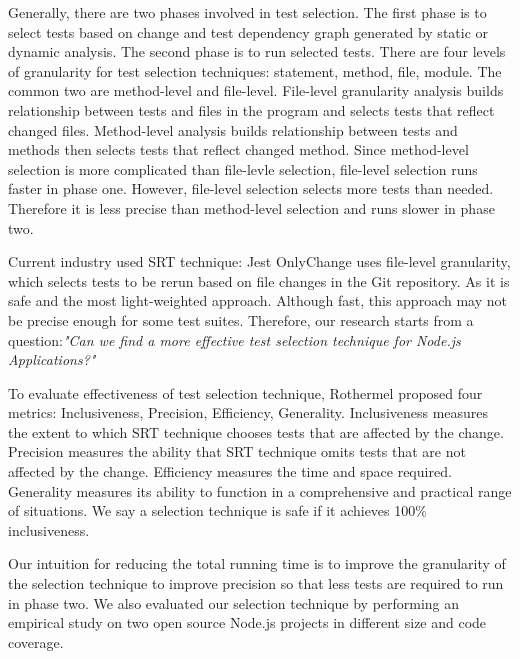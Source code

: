 \documentclass[10pt, conference]{IEEEtran}
\begin{document}
Generally, there are two phases involved in test selection. The first phase is to select tests based on change and 
test dependency graph generated by static or dynamic analysis. The second phase is to run selected tests.
There are four levels of granularity for test selection techniques: statement, method, file, module. The common 
two are method-level and file-level. File-level granularity analysis builds relationship between tests and files in 
the program and selects tests that reflect changed files. Method-level analysis builds relationship between tests and methods 
then selects tests that reflect changed method. Since method-level selection is more complicated than 
file-levle selection, file-level selection runs faster in phase one. However, file-level selection selects more 
tests than needed. Therefore it is less precise than method-level selection and runs slower in phase two. 

Current industry used SRT technique: Jest OnlyChange uses file-level granularity, which selects 
tests to be rerun based on file changes in the Git repository. As it is safe and the most light-weighted approach. Although fast, this approach may not be precise 
enough for some test suites. Therefore, our research starts from a question:\textit{"Can we find a more 
effective test selection technique for Node.js Applications?"} 

To evaluate effectiveness of test selection technique, Rothermel\cite{b13} proposed four metrics: Inclusiveness, Precision, Efficiency, Generality. Inclusiveness 
measures the extent to which SRT technique chooses tests that are affected by the change. Precision measures 
the ability that SRT technique omits tests that are not affected by the change. Efficiency measures the time and 
space required. Generality measures its ability to function in a comprehensive and practical range of situations.
We say a selection technique is safe if it achieves 100\% inclusiveness.

Our intuition for reducing the total running time is to 
improve the granularity of the selection technique to improve precision so that less tests are required to run in phase two. 
We also evaluated our selection technique by performing an empirical study on two open source Node.js projects in different 
size and code coverage.
\end{document}
